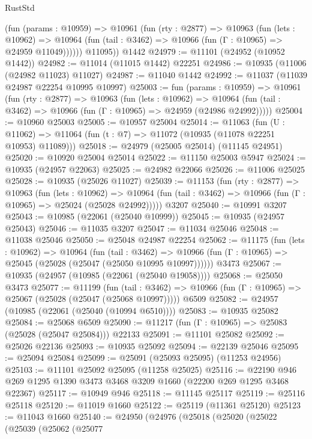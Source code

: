 \begin{lexlean}{RustStd}
\begin{coremodule}
{\begin{coremodule}
{{{{{{{{{{{{{{{{{{{{{{{{{{{{{{{{{{{{{{{{{{{{{{{{{{{{{{{{{{{{{{{{{{{{{{{{{{{{{{{{{{{{{          (fun (params : @10959) =>
          @10961
            (fun (rty : @2877) =>
            @10963
              (fun (lets : @10962) =>
              @10964 (fun (tail : @3462) => @10966 (fun (Γ : @10965) => @24959 @11049))))))
        @11095))
    @1442
@24979 := @11101 (@24952 (@10952 @1442))
@24982 := @11014 (@11015 @1442) @22251
@24986 := @10935 (@11006 (@24982 @11023) @11027)
@24987 := @11040 @1442
@24992 := @11037 (@11039 @24987 @22254 @10995 @10997)
@25003 := fun (params : @10959) =>
  @10961
    (fun (rty : @2877) =>
    @10963
      (fun (lets : @10962) =>
      @10964 (fun (tail : @3462) => @10966 (fun (Γ : @10965) => @24959 (@24986 @24992)))))
@25004 := @10960 @25003
@25005 := @10957 @25004
@25014 := @11063
    (fun (U : @11062) => @11064 (fun (t : @7) => @11072 (@10935 (@11078 @22251 @10953) @11089)))
@25018 := @24979 (@25005 @25014) (@11145 @24951)
@25020 := @10920 @25004 @25014
@25022 := @11150 @25003 @5947
@25024 := @10935 (@24957 @22063)
@25025 := @24982 @22066
@25026 := @11006 @25025
@25028 := @10935 (@25026 @11027)
@25039 := @11153
    (fun (rty : @2877) =>
    @10963
      (fun (lets : @10962) =>
      @10964 (fun (tail : @3462) => @10966 (fun (Γ : @10965) => @25024 (@25028 @24992)))))
    @3207
@25040 := @10991 @3207
@25043 := @10985 (@22061 (@25040 @10999))
@25045 := @10935 (@24957 @25043)
@25046 := @11035 @3207
@25047 := @11034 @25046
@25048 := @11038 @25046
@25050 := @25048 @24987 @22254
@25062 := @11175
    (fun (lets : @10962) =>
    @10964
      (fun (tail : @3462) =>
      @10966 (fun (Γ : @10965) => @25045 (@25028 (@25047 (@25050 @10995 @10997))))))
    @3473
@25067 := @10935 (@24957 (@10985 (@22061 (@25040 @19058))))
@25068 := @25050 @3473
@25077 := @11199
    (fun (tail : @3462) => @10966 (fun (Γ : @10965) => @25067 (@25028 (@25047 (@25068 @10997)))))
    @6509
@25082 := @24957 (@10985 (@22061 (@25040 (@10994 @6510))))
@25083 := @10935 @25082
@25084 := @25068 @6509
@25090 := @11217 (fun (Γ : @10965) => @25083 (@25028 (@25047 @25084))) @22133
@25091 := @11101 @25082
@25092 := @25026 @22136
@25093 := @10935 @25092
@25094 := @22139 @25046
@25095 := @25094 @25084
@25099 := @25091 (@25093 @25095) (@11253 @24956)
@25103 := @11101 @25092 @25095 (@11258 @25025)
@25116 := @22190 @946 @269 @1295 @1390 @3473 @3468 @3209 @1660 (@22200 @269 @1295 @3468 @22367)
@25117 := @10949 @946
@25118 := @11145 @25117
@25119 := @25116 @25118
@25120 := @11019 @1660
@25122 := @25119 (@11361 @25120)
@25123 := @11043 @1660
@25140 := @24950
    (@24976
      (@25018
        (@25020
          (@25022
            (@25039
              (@25062
                (@25077
}}}}}}}}}}}}}}}}}}}}}}}}}}}}}}}}}}}}}}}}}}}}}}}}}}}}}}}}}}}}}}}}}}}}}}}}}}}}}}}}}}}}}
\end{coremodule}}
\end{coremodule}
\end{lexlean}

